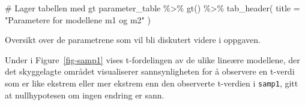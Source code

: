 \documentclass[
  letterpaper,
  DIV=11,
  numbers=noendperiod]{scrreprt}
\newenvironment{Shaded}{\begin{snugshade}}{\end{snugshade}}
\newcommand{\AttributeTok}[1]{\textcolor[rgb]{0.40,0.45,0.13}{#1}}
\newcommand{\CommentTok}[1]{\textcolor[rgb]{0.37,0.37,0.37}{#1}}
\newcommand{\FunctionTok}[1]{\textcolor[rgb]{0.28,0.35,0.67}{#1}}
\newcommand{\NormalTok}[1]{\textcolor[rgb]{0.00,0.23,0.31}{#1}}
\newcommand{\SpecialCharTok}[1]{\textcolor[rgb]{0.37,0.37,0.37}{#1}}
\newcommand{\StringTok}[1]{\textcolor[rgb]{0.13,0.47,0.30}{#1}}
\begin{document}
\begin{Shaded}
\begin{Highlighting}[]
\CommentTok{\# Lager tabellen med gt}
\NormalTok{parameter\_table }\SpecialCharTok{\%\textgreater{}\%}
  \FunctionTok{gt}\NormalTok{() }\SpecialCharTok{\%\textgreater{}\%}
  \FunctionTok{tab\_header}\NormalTok{(}
    \AttributeTok{title =} \StringTok{"Parametere for modellene m1 og m2"}
\NormalTok{  )}
\end{Highlighting}
\end{Shaded}

\begin{table}

\caption{\label{tbl-modeller}Oversikt over de parametrene som vil bli
diskutert videre i oppgaven.}


\end{table}%

Under i Figure~\ref{fig-samp1} vises t-fordelingen av de ulike lineære
modellene, der det skyggelagte området visualiserer sannsynligheten for
å observere en t-verdi som er like ekstrem eller mer ekstrem enn den
observerte t-verdien i \texttt{samp1}, gitt at nullhypotesen om ingen
endring er sann.
\end{document}
